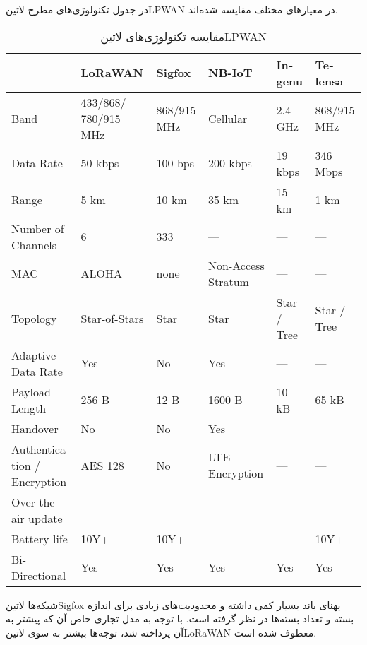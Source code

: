 در جدول  تکنولوژی‌های مطرح ‌لاتین{LPWAN} در معیارهای مختلف مقایسه شده‌اند.

\begin{table}
\caption{مقایسه تکنولوژی‌های ‌لاتین{LPWAN}   }
\label{جدول: مقایسه تکنولوژی‌های LPWAN}
\begin{latin}\begin{tabularx}
  {\textwidth}
  {|*{6}{X|}}
  \toprule
  &
  LoRaWAN &
  Sigfox &
  NB-IoT &
  Ingenu &
  Telensa \\
  \midrule
  Band &
  433/868/ 780/915 MHz &
  868/915 MHz &
  Cellular &
  2.4 GHz &
  868/915 MHz \\
  \midrule
  Data Rate &
  50 kbps &
  100 bps &
  200 kbps &
  19 kbps &
  346 Mbps \\
  \midrule
  Range &
  5 km &
  10 km &
  35 km &
  15 km &
  1 km \\
  \midrule
  Number of Channels &
  6 &
  333 &
  --- &
  --- &
  --- \\
  \midrule
  MAC &
  ALOHA &
  none &
  Non-Access Stratum &
  --- &
  --- \\
  \midrule
  Topology &
  Star-of-Stars &
  Star &
  Star &
  Star / Tree &
  Star / Tree \\
  \midrule
  Adaptive Data Rate &
  Yes &
  No &
  Yes &
  --- &
  --- \\
  \midrule
  Payload Length &
  256 B &
  12 B &
  1600 B &
  10 kB &
  65 kB \\
  \midrule
  Handover &
  No &
  No &
  Yes &
  --- &
  --- \\
  \midrule
  Authentication / Encryption &
  AES 128 &
  No &
  LTE Encryption &
  --- &
  --- \\
  \midrule
  Over the air update &
  --- &
  --- &
  --- &
  --- &
  --- \\
  \midrule
  Battery life &
  10Y+ &
  10Y+ &
  --- &
  --- &
  10Y+ \\
  Bi-Directional &
  Yes &
  Yes &
  Yes &
  Yes &
  Yes \\
  \bottomrule
\end{tabularx}\end{latin}
\end{table}

شبکه‌ها ‌لاتین{Sigfox} پهنای باند بسیار کمی داشته و محدودیت‌های زیادی برای اندازه بسته و تعداد بسته‌ها در نظر گرفته است. با توجه به مدل تجاری خاص آن که پیشتر
به آن پرداخته شد، توجه‌ها بیشتر به سوی ‌لاتین{LoRaWAN} معطوف شده است.


